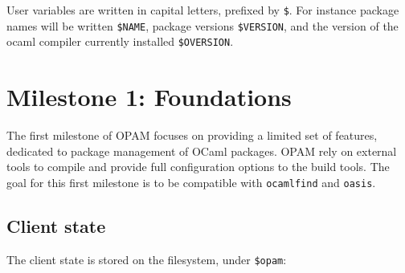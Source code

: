\documentclass[a4paper,11pt]{article}
\begin{document}
User variables are written in capital letters, prefixed by \verb+$+. For
instance package names will be written \verb+$NAME+, package versions
\verb+$VERSION+, and the version of the ocaml compiler currently
installed \verb+$OVERSION+.

\section{Milestone 1: Foundations}

The first milestone of OPAM focuses on providing a limited set of
features, dedicated to package management of OCaml packages. OPAM rely
on external tools to compile and provide full configuration options to
the build tools. The goal for this first milestone is to be compatible
with {\tt ocamlfind} and {\tt oasis}.

\subsection{Client state}
\label{client}

The client state is stored on the filesystem, under {\tt \$opam}:
\end{document}

